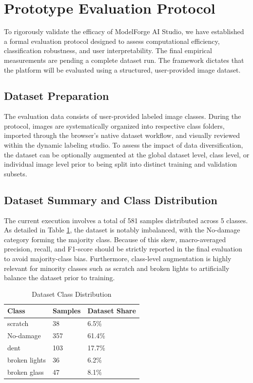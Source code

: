 \documentclass[conference]{IEEEtran}
\begin{document}
\section{Prototype Evaluation Protocol}

To rigorously validate the efficacy of ModelForge AI Studio, we have established a formal evaluation protocol designed to assess computational efficiency, classification robustness, and user interpretability. The final empirical measurements are pending a complete dataset run. The framework dictates that the platform will be evaluated using a structured, user-provided image dataset.

\subsection{Dataset Preparation}
The evaluation data consists of user-provided labeled image classes. During the protocol, images are systematically organized into respective class folders, imported through the browser's native dataset workflow, and visually reviewed within the dynamic labeling studio. To assess the impact of data diversification, the dataset can be optionally augmented at the global dataset level, class level, or individual image level prior to being split into distinct training and validation subsets.

\subsection{Dataset Summary and Class Distribution}
The current execution involves a total of 581 samples distributed across 5 classes. As detailed in Table \ref{tab:class_distribution}, the dataset is notably imbalanced, with the No-damage category forming the majority class. Because of this skew, macro-averaged precision, recall, and F1-score should be strictly reported in the final evaluation to avoid majority-class bias. Furthermore, class-level augmentation is highly relevant for minority classes such as scratch and broken lights to artificially balance the dataset prior to training.

\begin{table}[ht]
\centering
\caption{Dataset Class Distribution}
\label{tab:class_distribution}
\begin{tabular}{lll}
\toprule
\textbf{Class} & \textbf{Samples} & \textbf{Dataset Share} \\
\midrule
scratch & 38 & 6.5\% \\
No-damage & 357 & 61.4\% \\
dent & 103 & 17.7\% \\
broken lights & 36 & 6.2\% \\
broken glass & 47 & 8.1\% \\
\bottomrule
\end{tabular}
\end{table}
\end{document}
